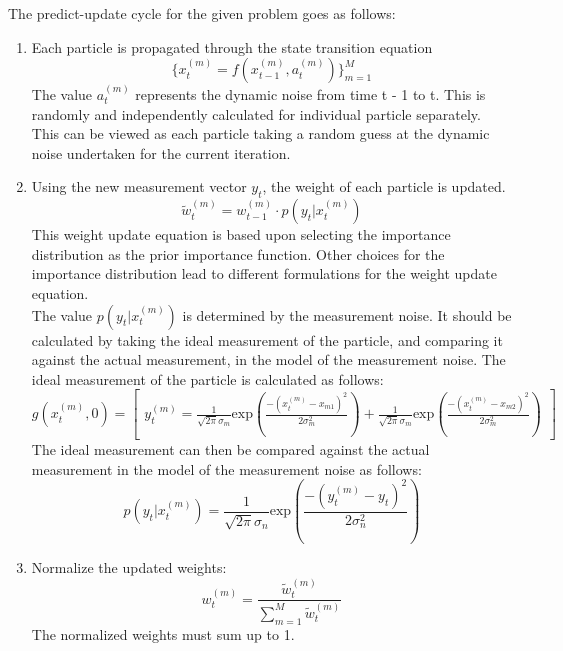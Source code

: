 \documentclass[12pt]{article}
\begin{document}
The predict-update cycle for the given problem goes as follows:
\begin{enumerate}
	\item Each particle is propagated through the state transition equation
	\begin{equation}
		\lbrace x_t^{(m)} = f(x_{t-1}^{(m)},a_t^{(m)}) \rbrace ^M_{m=1}
		\label{eq:particleTrans}
	\end{equation}
	The value $a_t^{(m)}$ represents the dynamic noise from time t - 1 to t. This is randomly and independently calculated for individual particle separately. This can be viewed as each particle taking a random guess at the dynamic noise undertaken for the current iteration. \\
	
	\item Using the new measurement vector $y_t$, the weight of each particle is updated. 
	\begin{equation}
	\tilde{w}_t^{(m)} = w_{t-1}^{(m)} \cdot p(y_t | x_t^{(m)})
	\label{eq:weightUpdate}
	\end{equation}
	This weight update equation is based upon selecting the importance distribution as the prior importance function. 			Other choices for the importance distribution lead to different formulations for the weight update equation.\\
	The value $p(y_t | x_t^{(m)})$ is determined by the measurement noise.
	It should be calculated by taking the ideal measurement of the particle, and comparing it against the actual 		     	measurement, in the model of the measurement noise. The ideal measurement of the particle is calculated as follows:
	\begin{equation}
		g(x_t^{(m)},0) = \begin{bmatrix}
		y_t^{(m)} = \frac{1}{\sqrt{2 \pi} \sigma_m}
		\mathrm{exp} ( \frac{-(x_t^{(m)} - x_{m1})^2}{2 \sigma_m^2} ) +
		\frac{1}{\sqrt{2 \pi} \sigma_m}
		\mathrm{exp} ( \frac{-(x_t^{(m)} - x_{m2})^2}{2 \sigma_m^2} )
		\end{bmatrix}
	\end{equation}
	The ideal measurement can then be compared against the actual
	measurement in the model of the measurement noise as follows:
	\begin{equation}
		p(y_t | x_t^{(m)}) = 
		\frac{1}{\sqrt{2 \pi} \sigma_n}
		\mathrm{exp} ( \frac{-(y_t^{(m)} - y_t)^2}{2 \sigma_n^2} )
	\end{equation}
	
	\item Normalize the updated weights:
	\begin{equation}
		w_t^{(m)} = \frac{\tilde{w}_t^{(m)}}{\sum_{m=1}^M \tilde{w}_t^{(m)}}
		\label{eq:weightNormalize}
	\end{equation}
	The normalized weights must sum up to 1.
	

\end{enumerate}
\end{document}
